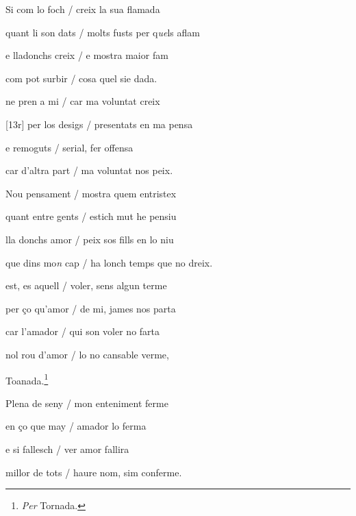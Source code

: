\documentclass[12pt]{article}
\begin{document}
\begin{estrofa}

 Si com lo foch / creix la sua flamada

 quant li son dats / molts fusts per q\textit{ue}ls aflam

 e lladonchs creix / e mostra maior fam

 com pot surbir / cosa quel sie dada.

 ne pren a mi / car ma voluntat creix

 [13r] per los desigs / presentats en ma pensa

 e remoguts / serial, fer offensa

 car d'altra part / ma voluntat nos peix.

\end{estrofa}



\begin{estrofa}

 Nou pensament / mostra quem entristex

 quant entre gents / estich mut he pensiu

 lla donchs amor / peix sos fills en lo niu

 que dins mo\textit{n} cap / ha lonch temps que no dreix.

 est, es aquell / voler, sens algun terme

 per \c{c}o qu'amor / de mi, james nos parta

 car l'amador / qui son voler no farta

 nol rou d'amor / lo no cansable verme,

\end{estrofa}


\begin{estrofaExtra}%




\begin{tornada}

 Toanada.\footnote{\textit{Per} Tornada.}

\end{tornada}


\end{estrofaExtra}


\begin{estrofa}

 Plena de seny / mon enteniment ferme

 en \c{c}o que may / amador lo ferma

 e si fallesch / ver amor fallira

 millor de tots / haure nom, sim conferme.

\end{estrofa}
\end{document}
